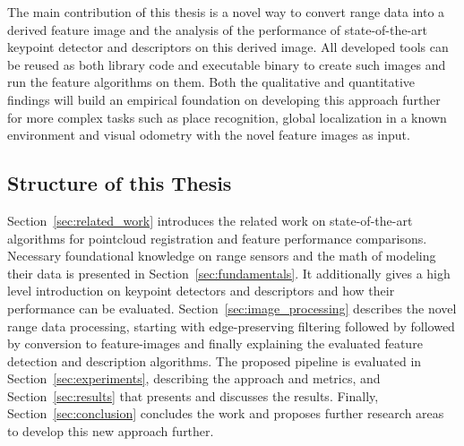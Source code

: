The main contribution of this thesis is a novel way to convert range data into a derived feature image and the analysis of the performance of state-of-the-art keypoint detector and descriptors on this derived image.
All developed tools can be reused as both library code and executable binary to create such images and run the feature algorithms on them.
Both the qualitative and quantitative findings will build an empirical foundation on developing this approach further for more complex tasks such as place recognition, global localization in a known environment and visual odometry with the novel feature images as input.

\subsection{Structure of this Thesis}

Section~\ref{sec:related_work} introduces the related work on state-of-the-art algorithms for pointcloud registration and feature performance comparisons.
Necessary foundational knowledge on range sensors and the math of modeling their data is presented in Section~\ref{sec:fundamentals}.
It additionally gives a high level introduction on keypoint detectors and descriptors and how their performance can be evaluated.
Section~\ref{sec:image_processing} describes the novel range data processing, starting with edge-preserving filtering followed by followed by conversion to feature-images and finally explaining the evaluated feature detection and description algorithms.
The proposed pipeline is evaluated in Section~\ref{sec:experiments}, describing the approach and metrics, and Section~\ref{sec:results} that presents and discusses the results.
Finally, Section~\ref{sec:conclusion} concludes the work and proposes further research areas to develop this new approach further.
